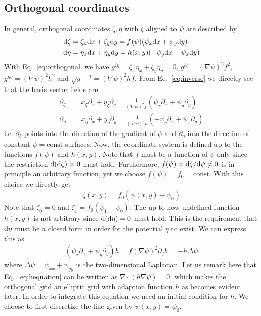 \subsection{Orthogonal coordinates} \label{sec:orthogonal}
In general, orthogonal coordinates $\zeta, \eta$ with $\zeta$ aligned to $\psi$ are described by
\begin{subequations}
\begin{align}
  \mathrm{d} \zeta & = \zeta_x\mathrm{d} x +\zeta_y\mathrm{d} y =  f(\psi)(\psi_x \mathrm{d} x + \psi_y \mathrm{d} y) \\
  \mathrm{d} \eta  & = \eta_x \mathrm{d} x + \eta_y \mathrm{d} y = h(x,y) ( -\psi_y \mathrm{d} x + \psi_x \mathrm{d} y)
\end{align}
  \label{eq:orthogonal}
\end{subequations}
With Eq.~\eqref{eq:orthogonal} we have $g^{\zeta\eta} = \zeta_x\eta_x + \zeta_y\eta_y = 0$,
$g^{\zeta\zeta} = (\nabla\psi)^2 f^2$, $g^{\eta\eta} = (\nabla\psi)^2h^2$ and $\sqrt{g}^{\,-1} = (\nabla\psi)^2 h f$. 
From Eq.~\eqref{eq:inverse} we directly see that the basis vector fields are
\begin{subequations}
\begin{align}
  \partial_\zeta&= x_\zeta\partial_x + y_\zeta\partial_y = \frac{1}{(\nabla\psi)^2f} (\psi_x \partial_x + \psi_y\partial_y) \\
  \partial_\eta &=  x_\eta\partial_x + y_\eta\partial_y =  \frac{1}{(\nabla\psi)^2h} (-\psi_y \partial_x + \psi_x\partial_y) 
\label{eq:orthogonal_linesb}
\end{align}
\label{eq:orthogonal_lines}
\end{subequations}
i.e. $\partial_\zeta$ points into the direction of the gradient of $\psi$ and $\partial_\eta$ into the direction of constant $\psi=\text{const}$ surfaces.
Now, the coordinate system is defined up to the functions $f(\psi)$ and $h(x,y)$.
Note that $f$ must be a function of $\psi$ only since the restriction $\mathrm{d}(\mathrm{d} \zeta)=0$ must hold.
Furthermore, $f(\psi) = \mathrm{d}\zeta/ \mathrm{d}\psi \neq 0 $ is in principle an arbitrary function, yet we choose $f(\psi) = f_0 = \text{const}$.
With this choice we directly get
\begin{align}
  \zeta(x,y) = f_0(\psi(x,y)-\psi_0)
  \label{eq:zeta}
\end{align}
Note that $\zeta_0=0$ and $\zeta_1=f_0(\psi_1-\psi_0)$.
The up to now undefined function $h(x,y)$ is not arbitrary since $\mathrm{d}(\mathrm{d} \eta) = 0$ must hold. This is the requirement that $\mathrm{d} \eta$ must be
a closed form in order for the potential $\eta$ to exist. 
We can express this as
\begin{align}
  (\psi_x\partial_x + \psi_y\partial_y) h = f(\nabla\psi)^2 \partial_\zeta h= -h\Delta \psi 
  \label{eq:hequation}
\end{align}
where $\Delta \psi = \psi_{xx} + \psi_{yy}$ is the two-dimensional Laplacian.
Let us remark here that Eq.~\eqref{eq:hequation} can be written as $\nabla\cdot\left( h\nabla\psi \right)=0$, which makes the orthogonal grid an elliptic grid
with adaption function $h$ as becomes evident later. 
In order to integrate this equation we need an initial condition for $h$. 
We choose to first discretize the line given by $\psi(x,y) = \psi_0$. 

